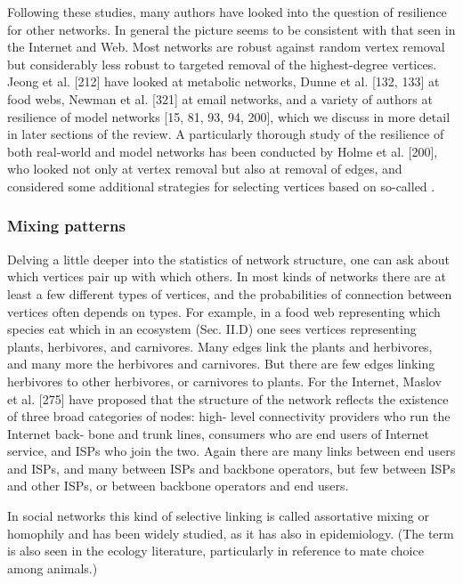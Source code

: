       Following these studies, many authors have looked into the question of resilience for other networks. In general the picture seems to be consistent with that seen in the Internet and Web. Most networks are robust against random vertex removal but considerably less robust to targeted removal of the highest-degree vertices. Jeong et al. [212] have looked at metabolic networks, Dunne et al. [132, 133] at food webs, Newman et al. [321] at email networks, and a variety of authors at resilience of model networks [15, 81, 93, 94, 200], which we discuss in more detail in later sections of the review. A particularly thorough study of the resilience of both real-world and model networks has been conducted by Holme et al. [200], who looked not only at vertex removal but also at removal of edges, and considered some additional strategies for selecting vertices based on so-called .
      
    \subsubsection{Mixing patterns}
    
      Delving a little deeper into the statistics of network structure, one can ask about which vertices pair up with which others. In most kinds of networks there are at least a few different types of vertices, and the probabilities of connection between vertices often depends on types. For example, in a food web representing which species eat which in an ecosystem (Sec. II.D) one sees vertices representing plants, herbivores, and carnivores. Many edges link the plants and herbivores, and many more the herbivores and carnivores. But there are few edges linking herbivores to other herbivores, or carnivores to plants. For the Internet, Maslov et al. [275] have proposed that the structure of the network reflects the existence of three broad categories of nodes: high- level connectivity providers who run the Internet back- bone and trunk lines, consumers who are end users of Internet service, and ISPs who join the two. Again there are many links between end users and ISPs, and many between ISPs and backbone operators, but few between ISPs and other ISPs, or between backbone operators and end users.
      
      In social networks this kind of selective linking is called assortative mixing or homophily and has been widely studied, as it has also in epidemiology. (The term  is also seen in the ecology literature, particularly in reference to mate choice among animals.) 
      
